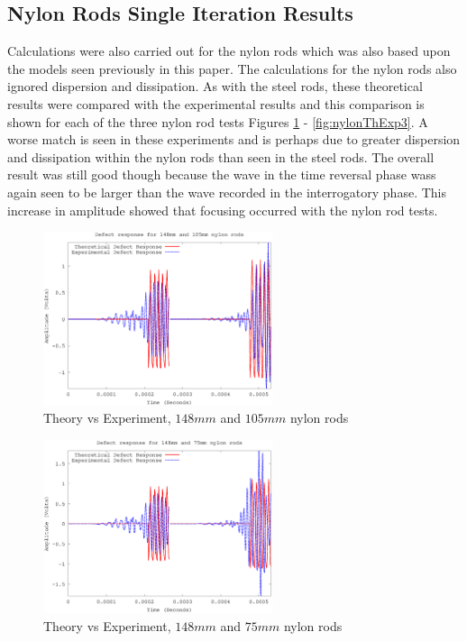  \subsection{Nylon Rods Single Iteration Results}
 Calculations were also carried out for the nylon rods which was also based upon the models seen previously in this paper. The calculations for the nylon rods also ignored dispersion and dissipation. As with the steel rods, these theoretical results were compared with the experimental results and this comparison is shown for each of the three nylon rod tests Figures \ref{fig:nylonThExp1} - \ref{fig:nylonThExp3}. A worse match is seen in these experiments and is perhaps due to greater dispersion and dissipation within the nylon rods than seen in the steel rods. The overall result was still good though because the wave in the time reversal phase wass again seen to be larger than the wave recorded in the interrogatory phase. This increase in amplitude showed that focusing occurred with the nylon rod tests. 
 
 \begin{figure}[ht!]
 \centering
 \includegraphics[width=0.6\textwidth]{eps_pics/nylon-2-3_Iter_th_exp.eps}
 \caption{Theory vs Experiment, $148 mm$ and $105 mm$ nylon rods
 	 \label{fig:nylonThExp1}} 
 \end{figure}
 
 \begin{figure}[ht!]
 \centering
 \includegraphics[width=0.6\textwidth]{eps_pics/nylon-2-4_Iter_th_exp.eps}
 \caption{Theory vs Experiment, $148 mm$ and $75 mm$ nylon rods
 	 \label{fig:nylonThExp2}} 
 \end{figure}
 
